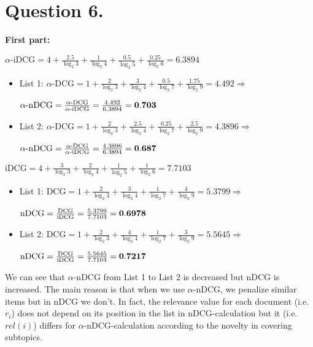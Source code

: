 \documentclass[11pt]{article}
\begin{document}
\section*{Question 6.}%

{\bf First part:}

$\alpha \text{-iDCG} = 4+\frac{2.5}{\log_2 3}+\frac{1}{\log_2 4}+\frac{0.5}{\log_2 5}+\frac{0.25}{\log_2 6} = 6.3894$
\begin{itemize}
\item List 1: $\alpha\text{-DCG} = 1+\frac{2}{\log_2 3}+\frac{3}{\log_2 4}+\frac{0.5}{\log_2 7}+\frac{1.75}{\log_2 9} = 4.492 \Longrightarrow$ 

$\alpha\text{-nDCG} = \frac{\alpha\text{-DCG}}{\alpha\text{-iDCG}} = \frac{4.492}{6.3894}= {\bf 0.703}$

\item List 2: $\alpha\text{-DCG} = 1+\frac{2}{\log_2 3}+\frac{2.5}{\log_2 4}+\frac{0.25}{\log_2 7}+\frac{2.5}{\log_2 9} = 4.3896 \Longrightarrow$ 

$\alpha\text{-nDCG} = \frac{\alpha\text{-DCG}}{\alpha\text{-iDCG}} = \frac{4.3896}{6.3894}= {\bf 0.687}$
\end{itemize}

\hspace{-6mm}{\bf Second part:}

$\text{iDCG} = 4+\frac{3}{\log_2 3}+\frac{2}{\log_2 4}+\frac{1}{\log_2 5}+\frac{1}{\log_2 6} = 7.7103$
\begin{itemize}
\item List 1: $\text{DCG} = 1+\frac{2}{\log_2 3}+\frac{3}{\log_2 4}+\frac{1}{\log_2 7}+\frac{4}{\log_2 9} = 5.3799  \Longrightarrow$ 

$\text{nDCG} = \frac{\text{DCG}}{\text{iDCG}} = \frac{5.3799}{7.7103}= {\bf 0.6978}$

\item List 2: $\text{DCG} = 1+\frac{2}{\log_2 3}+\frac{4}{\log_2 4}+\frac{1}{\log_2 7}+\frac{3}{\log_2 9} = 5.5645 \Longrightarrow$ 

$\text{nDCG} = \frac{\text{DCG}}{\text{iDCG}} = \frac{5.5645}{7.7103}= {\bf 0.7217}$
\end{itemize}

\hspace{-6mm}{\bf Third part:} 

We can see that $\alpha\text{-nDCG}$ from List 1 to List 2 is decreased but $\text{nDCG}$ is increased. The main reason is that when we use $\alpha\text{-nDCG}$, we penalize similar items but in $\text{nDCG}$ we don't. In fact, the relevance value for each document (i.e. $r_i$) does not depend on its position in the list in $\text{nDCG}$-calculation but it (i.e. $rel(i)$) differs for $\alpha\text{-nDCG}$-calculation according to the novelty in covering subtopics. 
\end{document}
